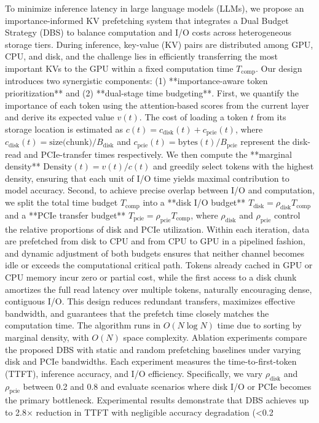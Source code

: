 {
	To minimize inference latency in large language models (LLMs), we propose an importance-informed KV prefetching system that integrates a Dual Budget Strategy (DBS) to balance computation and I/O costs across heterogeneous storage tiers. During inference, key-value (KV) pairs are distributed among GPU, CPU, and disk, and the challenge lies in efficiently transferring the most important KVs to the GPU within a fixed computation time $T_{\text{comp}}$. Our design introduces two synergistic components: (1) **importance-aware token prioritization** and (2) **dual-stage time budgeting**. First, we quantify the importance of each token using the attention-based scores from the current layer and derive its expected value $v(t)$. The cost of loading a token $t$ from its storage location is estimated as $c(t) = c_{\text{disk}}(t) + c_{\text{pcie}}(t)$, where $c_{\text{disk}}(t) = \text{size(chunk)}/B_{\text{disk}}$ and $c_{\text{pcie}}(t) = \text{bytes}(t)/B_{\text{pcie}}$ represent the disk-read and PCIe-transfer times respectively. We then compute the **marginal density** $\text{Density}(t) = v(t)/c(t)$ and greedily select tokens with the highest density, ensuring that each unit of I/O time yields maximal contribution to model accuracy. Second, to achieve precise overlap between I/O and computation, we split the total time budget $T_{\text{comp}}$ into a **disk I/O budget** $T_{\text{disk}} = \rho_{\text{disk}}T_{\text{comp}}$ and a **PCIe transfer budget** $T_{\text{pcie}} = \rho_{\text{pcie}}T_{\text{comp}}$, where $\rho_{\text{disk}}$ and $\rho_{\text{pcie}}$ control the relative proportions of disk and PCIe utilization. Within each iteration, data are prefetched from disk to CPU and from CPU to GPU in a pipelined fashion, and dynamic adjustment of both budgets ensures that neither channel becomes idle or exceeds the computational critical path. Tokens already cached in GPU or CPU memory incur zero or partial cost, while the first access to a disk chunk amortizes the full read latency over multiple tokens, naturally encouraging dense, contiguous I/O. This design reduces redundant transfers, maximizes effective bandwidth, and guarantees that the prefetch time closely matches the computation time. The algorithm runs in $O(N\log N)$ time due to sorting by marginal density, with $O(N)$ space complexity. Ablation experiments compare the proposed DBS with static and random prefetching baselines under varying disk and PCIe bandwidths. Each experiment measures the time-to-first-token (TTFT), inference accuracy, and I/O efficiency. Specifically, we vary $\rho_{\text{disk}}$ and $\rho_{\text{pcie}}$ between 0.2 and 0.8 and evaluate scenarios where disk I/O or PCIe becomes the primary bottleneck. Experimental results demonstrate that DBS achieves up to 2.8× reduction in TTFT with negligible accuracy degradation (<0.2%
}
